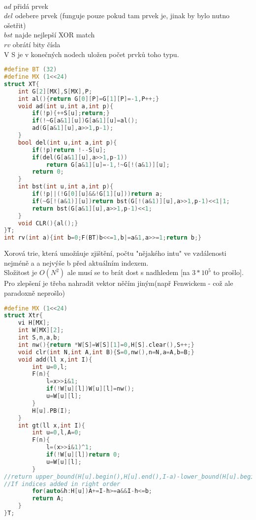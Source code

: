 \documentclass[11pt]{article}
\begin{document}
\\$ad$ přidá prvek
\\$del$ odebere prvek (funguje pouze pokud tam prvek je, jinak by bylo nutno ošetřit)
\\$bst$ najde nejlepší XOR match
\\$rv$ obrátí bity čísla
\\V \textsf{S} je v konečných nodech uložen počet prvků toho typu.
\begin{lstlisting}[language=C++]
#define BT (32)
#define MX (1<<24)
struct XT{
    int G[2][MX],S[MX],P;
    int al(){return G[0][P]=G[1][P]=-1,P++;}
    void ad(int u,int a,int p){
        if(!p){++S[u];return;}
        if(!~G[a&1][u])G[a&1][u]=al();
        ad(G[a&1][u],a>>1,p-1);
    }
    bool del(int u,int a,int p){
        if(!p)return !--S[u];
        if(del(G[a&1][u],a>>1,p-1))
            return G[a&1][u]=-1,!~G[!(a&1)][u];
        return 0;
    }
    int bst(int u,int a,int p){
        if(!p||(!G[0][u]&&!G[1][u]))return a;
        if(~G[!(a&1)][u])return bst(G[!(a&1)][u],a>>1,p-1)<<1|1;
        return bst(G[a&1][u],a>>1,p-1)<<1;
    }
    void CLR(){al();}
}T;
int rv(int a){int b=0;F(BT)b<<=1,b|=a&1,a>>=1;return b;}
\end{lstlisting}
Xorová trie, která umožňuje zjištění, počtu "nějakého intu" ve vzdálenosti nejméně \textsf{a} a nejvýše \textsf{b} před aktuálním indexem.
\\Složitost je $O(N^2)$ ale musí se to brát dost s nadhledem [na $3*10^5$ to prošlo]. Pro zlepšení je třeba nahradit vektor něčím jiným(např Fenwickem - což ale paradoxně neprošlo)
\begin{lstlisting}[language=C++]
#define MX (1<<24)
struct Xtr{
    vi H[MX];
    int W[MX][2];
    int S,n,a,b;
    int nw(){return *W[S]=W[S][1]=0,H[S].clear(),S++;}
    void clr(int N,int A,int B){S=0,nw(),n=N,a=A,b=B;}
    void add(ll x,int I){
        int u=0,l;
        F(n){
            l=x>>i&1;
            if(!W[u][l])W[u][l]=nw();
            u=W[u][l];
        }
        H[u].PB(I);
    }
    int gt(ll x,int I){
        int u=0,l,A=0;
        F(n){
            l=(x>>i&1)^1;
            if(!W[u][l])return 0;
            u=W[u][l];
        }
//return upper_bound(H[u].begin(),H[u].end(),I-a)-lower_bound(H[u].begin(),H[u].end(),I-b);
//If indices added in right order
        for(auto&h:H[u])A+=I-h>=a&&I-h<=b;
        return A;
    }
}T;
\end{lstlisting}
\end{document}
